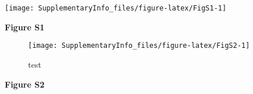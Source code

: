 \documentclass[12pt,]{article}
\begin{document}
\begin{center}\texttt{[image: SupplementaryInfo\_files/figure-latex/FigS1-1]} \end{center}

\textbf{Figure S1}

\pagebreak

\begin{figure}

{\centering \texttt{[image: SupplementaryInfo\_files/figure-latex/FigS2-1]} 

}

\caption{test}\label{fig:FigS2}
\end{figure}

\textbf{Figure S2}

\begin{landscape}\begingroup\fontsize{8}{10}\selectfont


\end{landscape}
\end{document}

